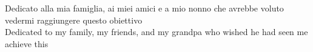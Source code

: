 
{}
\thispagestyle{empty}

\vspace*{3cm}

\begin{center}
Dedicato alla mia famiglia, ai miei amici e a mio nonno che avrebbe voluto vedermi raggiungere questo obiettivo\\
Dedicated to my family, my friends, and my grandpa who wished he had seen me achieve this
\end{center}
